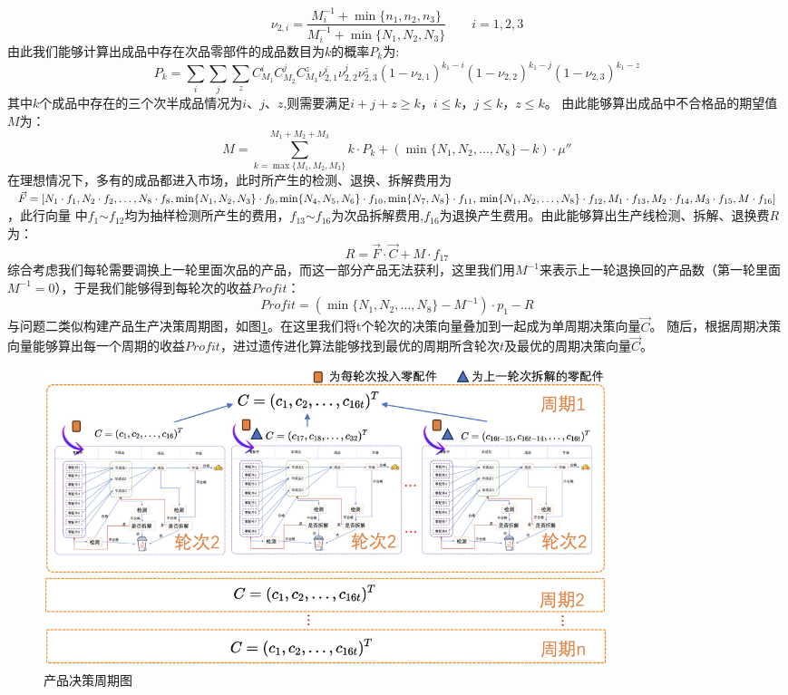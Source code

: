 \documentclass[withoutpreface,bwprint]{cumcmthesis} %
\begin{document}
$$\nu_{2,i}=\frac{M_{i}^{-1}+\min \{ n_{1},n_{2},n_{3}\}}{M_{i}^{-1}+\min \{N_{1},N_{2},N_{3}\}}\qquad i=1,2,3$$
由此我们能够计算出成品中存在次品零部件的成品数目为$k$的概率$P_{k}$为:
\begin{equation}
	P_{k}=\sum_{i}\sum_{j}\sum_{z}C_{M_{1}}^{i}C_{M_{2}}^{j}C_{M_{3}}^{z}\nu_{2,1}^{i}\nu_{2,2}^{j}\nu_{2,3}^{z}(1-\nu_{2,1})^{k_{1}-i}(1-\nu_{2,2})^{k_{1}-j}(1-\nu_{2,3})^{k_{1}-z}
	\label{eq:9}
\end{equation}
其中$k$个成品中存在的三个次半成品情况为$i$、$j$、$z$,则需要满足$i+j+z \ge k$，$i\le k$，$j\le k$，$z\le k$。
由此能够算出成品中不合格品的期望值$M$为：
\begin{equation}
	M=\sum_{k=\max \{M_{1},M_{2},M_{3}\}}^{M_{1}+M_{2}+M_{3}}k\cdot P_{k}+(\min \{N_{1},N_{2},\dots,N_{8}\}-k)\cdot \mu''
	\label{eq:10}
\end{equation}
在理想情况下，多有的成品都进入市场，此时所产生的检测、退换、拆解费用为$\vec{F}=[N_{1}\cdot f_{1},N_{2}\cdot f_{2},\dots,N_{8}\cdot f_{8},
\min \{ N_{1},N_{2},N_{3}\}\cdot f_{9},\min \{ N_{4},N_{5},N_{6}\}\cdot f_{10},\min \{ N_{7},N_{8}\}\cdot f_{11},\\
\min \{N_{1},N_{2},\dots,N_{8}\}\cdot f_{12},M_{1}\cdot f_{13},M_{2}\cdot f_{14},M_{3}\cdot f_{15},M\cdot f_{16}]$，此行向量
中$f_{1}$$\sim$$f_{12}$均为抽样检测所产生的费用，$f_{13}$$\sim$$f_{16}$为次品拆解费用,$f_{16}$为退换产生费用。由此能够算出生产线检测、拆解、退换费$R$为：
\begin{equation}
	R=\vec{F}\cdot \vec{C} + M\cdot f_{17}
	\label{eq:11}
\end{equation}
综合考虑我们每轮需要调换上一轮里面次品的产品，而这一部分产品无法获利，这里我们用$M^{-1}$来表示上一轮退换回的产品数（第一轮里面$M^{-1}=0$），于是我们能够得到每轮次的收益$Profit$：
\begin{equation}
	\textit{Profit}=(\min \{N_{1},N_{2},\dots,N_{8}\}-M^{-1})\cdot p_{1}-R
	\label{eq:12}
\end{equation}
与问题二类似构建产品生产决策周期图，如图\ref{fig:pro3-2}。在这里我们将t个轮次的决策向量叠加到一起成为单周期决策向量$\vec{C}$。
随后，根据周期决策向量能够算出每一个周期的收益$Profit$，进过遗传进化算法能够找到最优的周期所含轮次$t$及最优的周期决策向量$\vec{C}$。
\begin{figure}[H]
	\centering
	\includegraphics[width=0.8\textwidth]{Fig/pro3-2.png}      
	\caption{产品决策周期图}
	\label{fig:pro3-2}
\end{figure}
\end{document}
